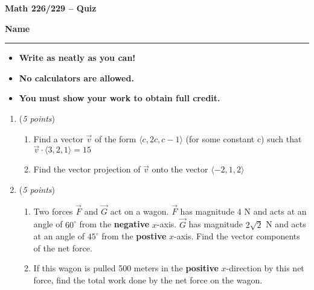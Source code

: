 \documentclass[12 pt]{article}
\begin{document}
  \begin{center}
    \textbf{\hfill Math 226/229 -- Quiz} \\
  \end{center}
  \medskip

  \noindent
  \textbf{Name}\ \rule{3.5in}{.4pt} \hfill
  \vspace{.1in}
  \hspace*{0.2in}
  \begin{itemize}
    \item \textbf{Write as neatly as you can!}
    \item \textbf{No calculators are allowed.}
    \item \textbf{You must show your work to obtain full credit.}
  \end{itemize}

	\medskip
  \noindent

  \begin{enumerate}
    \item (\textit{5 points})
    \begin{enumerate}
	  \item Find a vector $\vec{v}$ of the form $\langle c, 2c, c-1\rangle$ (for some constant c)
      such that $\vec{v} \cdot \langle 3, 2, 1\rangle = 15$
	  \item Find the vector projection of $\vec{v}$ onto the vector $\langle -2, 1, 2\rangle$
	\end{enumerate}
		\vspace{2in}
		\item (\textit{5 points})
		\begin{enumerate}
			\item Two forces $\overrightarrow{F}$ and $\overrightarrow{G}$ act on a wagon. $\overrightarrow{F}$ has magnitude $4$ N and acts at an angle of $60^\circ$ from the \textbf{negative} $x$-axis. $\overrightarrow{G}$ has magnitude  $2\sqrt2$ N and acts at an angle of $45^\circ$ from the \textbf{postive} $x$-axis. Find the vector components of the net force.
			\item If this wagon is pulled 500 meters in the \textbf{positive} $x$-direction by this net force, find the total work done by the net force on the wagon.
		\end{enumerate}
  \end{enumerate}
\end{document}
